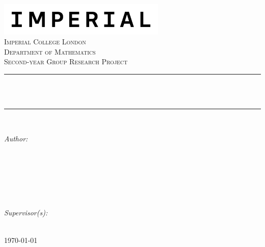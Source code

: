 \documentclass[../main.tex]{subfiles}
\begin{document}
\newcommand{\HRule}{\rule{\linewidth}{0.5mm}} %
\includegraphics[width=8cm]{Imperial_logo.png}\\[1cm] %
\center %
\textsc{\LARGE Imperial College London}\\[0.5cm] 
\textsc{\Large Department of Mathematics}\\[1.5cm] 
\textsc{\Large Second-year Group Research Project}\\[0.5cm]
\makeatletter
\HRule \\[0.6cm]
{ \huge \bfseries \reporttitle}\\[0.6cm] %
\HRule \\[1.5cm]
\begin{minipage}{0.4\textwidth}
\begin{flushleft} \large
\emph{Author:}\\
\reportauthorA \\
\reportauthorB \\
\reportauthorC \\
\reportauthorD \\
\reportauthorE
\end{flushleft}
\end{minipage}
~
\begin{minipage}{0.4\textwidth}
\begin{flushright} \large
\emph{Supervisor(s):} \\
\supervisor %
\end{flushright}
\end{minipage}\\[2cm]
\makeatother
\vfill
\makeatletter
{\large \today}\\[2cm] %
\makeatother
\end{document}
